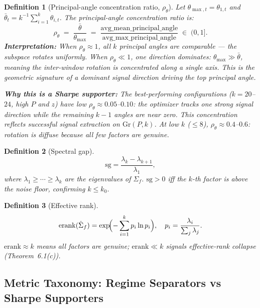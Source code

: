\documentclass[11pt,a4paper]{article}
\newtheorem{definition}{Definition}
\begin{document}
\begin{definition}[Principal-angle concentration ratio, $\rho_\theta$]
\label{def:paratio}
Let $\theta_{\max,t} = \theta_{1,t}$ and $\bar\theta_t = k^{-1}\sum_{i=1}^k \theta_{i,t}$.  The \emph{principal-angle concentration ratio} is:
\begin{equation}
  \rho_\theta
  \;=\; \frac{\bar\theta}{\theta_{\max}}
  \;=\; \frac{\text{avg\_mean\_principal\_angle}}
             {\text{avg\_max\_principal\_angle}}
  \;\in\; (0, 1].
  \label{eq:paratio}
\end{equation}
\textbf{Interpretation:}  When $\rho_\theta \approx 1$, all $k$ principal angles are comparable --- the subspace rotates uniformly.  When $\rho_\theta \ll 1$, one direction dominates: $\theta_{\max} \gg \bar\theta$, meaning the inter-window rotation is concentrated along a single axis.  This is the geometric signature of a \emph{dominant signal direction} driving the top principal angle.

\textbf{Why this is a Sharpe supporter:}  The best-performing configurations ($k = 20$--$24$, high $P$ and $z$) have low $\rho_\theta \approx 0.05$--$0.10$: the optimizer tracks one strong signal direction while the remaining $k - 1$ angles are near zero.  This concentration reflects successful signal extraction on $\mathrm{Gr}(P, k)$.  At low $k$ ($\leq 8$), $\rho_\theta \approx 0.4$--$0.6$: rotation is diffuse because all few factors are genuine.
\end{definition}

\begin{definition}[Spectral gap]
\[
  \mathrm{sg} = \frac{\lambda_k - \lambda_{k+1}}{\lambda_1},
\]
where $\lambda_1 \geq \cdots \geq \lambda_k$ are the eigenvalues of $\hat\Sigma_f$.  $\mathrm{sg} > 0$ iff the $k$-th factor is above the noise floor, confirming $k \leq k_0$.
\end{definition}

\begin{definition}[Effective rank]
\[
  \mathrm{erank}(\hat\Sigma_f) = \exp\!\Bigl(-\sum_{i=1}^k p_i \ln p_i\Bigr),
  \quad p_i = \frac{\lambda_i}{\sum_j \lambda_j}.
\]
$\mathrm{erank} \approx k$ means all factors are genuine; $\mathrm{erank} \ll k$ signals effective-rank collapse (Theorem~6.1(c)).
\end{definition}


\subsection{Metric Taxonomy: Regime Separators vs Sharpe Supporters}
\end{document}
